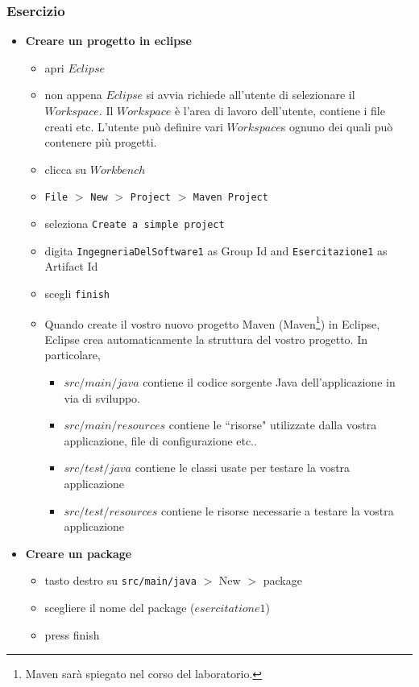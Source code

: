 \documentclass{article}
\theoremstyle{definition}
\begin{document}
\subsubsection{Esercizio}

\begin{itemize}
\item \textbf{Creare un progetto in eclipse}
\begin{itemize}
\item apri $Eclipse$
\item non appena $Eclipse$ si avvia richiede all'utente di selezionare il $Workspace$. Il $Workspace$ \`e l'area di lavoro dell'utente, contiene i file creati etc. L'utente pu\`o definire vari $Workspace$s ognuno dei quali pu\`o contenere pi\`u progetti.
\item clicca su $Workbench$ 
\item \texttt{File} $>$ \texttt{New} $>$ \texttt{Project} $>$ \texttt{Maven Project}
\item seleziona \texttt{Create a simple project}
\item digita \texttt{IngegneriaDelSoftware1} as Group Id and \texttt{Esercitazione1} as Artifact Id
\item scegli \texttt{finish}
\item Quando create il vostro nuovo progetto Maven (Maven\footnote{Maven sar\`a spiegato nel corso del laboratorio.}) in Eclipse, Eclipse crea automaticamente la struttura del vostro progetto. In particolare, 
\begin{itemize}
\item $src/main/java$ contiene il codice sorgente Java dell'applicazione in via di sviluppo.
\item $src/main/resources$ contiene le ``risorse" utilizzate dalla vostra applicazione, file di configurazione etc..
\item $src/test/java$ contiene le classi usate per testare la vostra applicazione
\item $src/test/resources$ contiene le risorse necessarie a testare la vostra applicazione
\end{itemize}
\end{itemize}
\end{itemize}



\begin{itemize}
\item \textbf{Creare un package}
\begin{itemize}
\item tasto destro su \texttt{src/main/java} $>$ New $>$ package 
\item scegliere il nome del package ($esercitatione1$)
\item press finish
\end{itemize}
\end{itemize}
\end{document}
